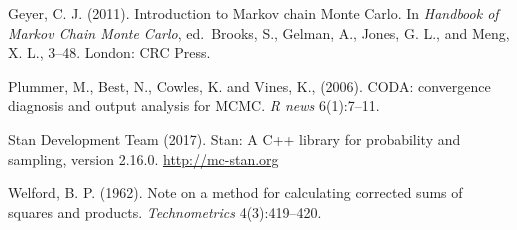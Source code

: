 \documentclass[11pt]{article}
\begin{document}
\bibitem Geyer, C. J. (2011). Introduction to Markov chain Monte Carlo. In {\em Handbook of Markov Chain Monte Carlo}, ed.\ Brooks, S., Gelman, A., Jones, G. L., and Meng, X. L., 3--48.  London:  CRC Press.

\bibitem Plummer, M., Best, N., Cowles, K. and Vines, K., (2006). CODA: convergence diagnosis and output analysis for MCMC. {\em R news} 6(1):7--11.

\bibitem Stan Development Team (2017). Stan: A C++ library for probability and sampling, version 2.16.0.   \url{http://mc-stan.org}

\bibitem Welford, B. P. (1962). Note on a method for calculating corrected sums of squares and products. {\em Technometrics} 4(3):419--420.
\end{document}

